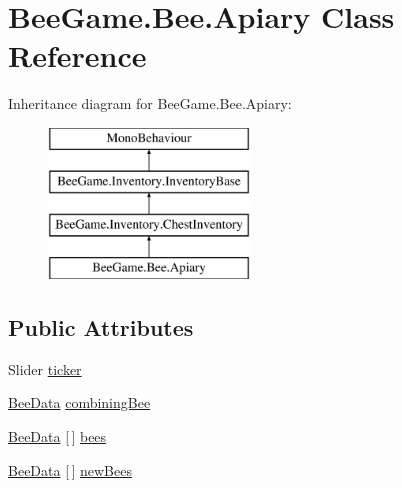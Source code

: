 \hypertarget{class_bee_game_1_1_bee_1_1_apiary}{}\section{Bee\+Game.\+Bee.\+Apiary Class Reference}
\label{class_bee_game_1_1_bee_1_1_apiary}


 


Inheritance diagram for Bee\+Game.\+Bee.\+Apiary\+:\begin{figure}[H]
\begin{center}
\leavevmode
\includegraphics[height=4.000000cm]{class_bee_game_1_1_bee_1_1_apiary}
\end{center}
\end{figure}
\subsection*{Public Attributes}
\begin{DoxyCompactItemize}
\item 
Slider \hyperlink{class_bee_game_1_1_bee_1_1_apiary_a7af4d39f709090d5e5f0c8877e3bbb8d}{ticker}
\item 
\hyperlink{struct_bee_game_1_1_bee_1_1_bee_data}{Bee\+Data} \hyperlink{class_bee_game_1_1_bee_1_1_apiary_a3b3bbe1a8ba0be1c3310a2660b1cdf42}{combining\+Bee}
\item 
\hyperlink{struct_bee_game_1_1_bee_1_1_bee_data}{Bee\+Data} \mbox{[}$\,$\mbox{]} \hyperlink{class_bee_game_1_1_bee_1_1_apiary_abcab0d8cecc18c58a9d01cdf997c7420}{bees}
\item 
\hyperlink{struct_bee_game_1_1_bee_1_1_bee_data}{Bee\+Data} \mbox{[}$\,$\mbox{]} \hyperlink{class_bee_game_1_1_bee_1_1_apiary_a930b4325062b0d6c80581784c23976e8}{new\+Bees}
\end{DoxyCompactItemize}
